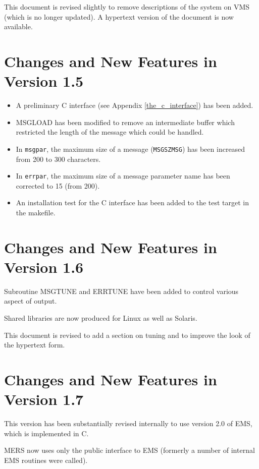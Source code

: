 \documentclass[twoside,11pt]{article}
\newcommand{\htmlref}[2]{#1}
\newcommand{\latex}[1]{#1}
\newcommand{\xref}[3]{#1}
\newcommand{\xlabel}[1]{}
\renewcommand{\_}{\texttt{\symbol{95}}}
\begin{document}
This document is revised slightly to remove descriptions of the system on VMS
(which is no longer updated). A hypertext version of the document is now
available.

\section{\xlabel{changes_and_new_features_in_version_1_5}Changes and New Features in Version 1.5}
\begin{itemize}
\item A preliminary
\htmlref{C interface}{the_c_interface}\latex{ (see Appendix
\ref{the_c_interface})} has been added.
\item MSG\_LOAD has been modified to remove an intermediate buffer which
restricted the length of the message which could be handled.
\item In \texttt{msg\_par}, the maximum size of a message
(\texttt{MSG\_\_SZMSG}) has been increased from 200 to 300 characters.
\item In \texttt{err\_par}, the maximum size of a message parameter name has
been corrected to 15 (from 200).
\item An installation test for the C interface has been added to the test
target in the makefile.
\end{itemize}

\section{\xlabel{changes_and_new_features_in_version_1_6}Changes and New Features in Version 1.6}
Subroutine
\htmlref{MSG\_TUNE}{MSG_TUNE}
and
\htmlref{ERR\_TUNE}{ERR_TUNE}
have been added to control various aspect of output.

Shared libraries are now produced for Linux as well as Solaris.

This document is revised to add a section on
\htmlref{tuning}{tuning} and to improve the look of the hypertext form.

\section{\xlabel{changes_and_new_features_in_version_1_7}Changes and New Features in Version 1.7}
This version has been substantially revised internally to use version 2.0 of
\xref{EMS}{ssn4}{},
which is implemented in C.

MERS now uses only the public interface to EMS (formerly a number of internal
EMS routines were called).
\end{document}
